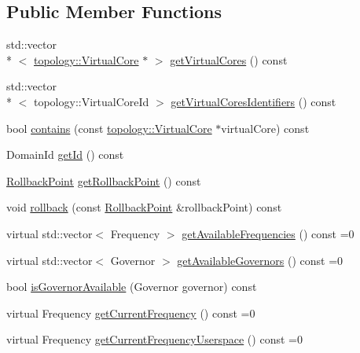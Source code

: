 \subsection*{Public Member Functions}
\begin{DoxyCompactItemize}
\item 
std\-::vector\\*
$<$ \hyperlink{classmammut_1_1topology_1_1VirtualCore}{topology\-::\-Virtual\-Core} $\ast$ $>$ \hyperlink{classmammut_1_1cpufreq_1_1Domain_aadbd6c6cd1d9c9abd6ac0100623b6f55}{get\-Virtual\-Cores} () const 
\item 
std\-::vector\\*
$<$ topology\-::\-Virtual\-Core\-Id $>$ \hyperlink{classmammut_1_1cpufreq_1_1Domain_a1952a345d43f937eb677170c488beeaf}{get\-Virtual\-Cores\-Identifiers} () const 
\item 
bool \hyperlink{classmammut_1_1cpufreq_1_1Domain_a48f7f709c4de763ae757cf792ef20f6c}{contains} (const \hyperlink{classmammut_1_1topology_1_1VirtualCore}{topology\-::\-Virtual\-Core} $\ast$virtual\-Core) const 
\item 
Domain\-Id \hyperlink{classmammut_1_1cpufreq_1_1Domain_a9e704e1fa89206f5238e8cc12eb1c3d0}{get\-Id} () const 
\item 
\hyperlink{structmammut_1_1cpufreq_1_1RollbackPoint}{Rollback\-Point} \hyperlink{classmammut_1_1cpufreq_1_1Domain_a7ce84c12b87b4aabb14686c38f64feae}{get\-Rollback\-Point} () const 
\item 
void \hyperlink{classmammut_1_1cpufreq_1_1Domain_abcd5b9b96fc708cd5456e8856a1b6f8a}{rollback} (const \hyperlink{structmammut_1_1cpufreq_1_1RollbackPoint}{Rollback\-Point} \&rollback\-Point) const 
\item 
virtual std\-::vector$<$ Frequency $>$ \hyperlink{classmammut_1_1cpufreq_1_1Domain_a77f57f47e688a3aaae168a2f9e8dc062}{get\-Available\-Frequencies} () const =0
\item 
virtual std\-::vector$<$ Governor $>$ \hyperlink{classmammut_1_1cpufreq_1_1Domain_ab72f441a05214166a07c4ece122f02c6}{get\-Available\-Governors} () const =0
\item 
bool \hyperlink{classmammut_1_1cpufreq_1_1Domain_a0e4d5b325d00884509f3c1f34d2525a3}{is\-Governor\-Available} (Governor governor) const 
\item 
virtual Frequency \hyperlink{classmammut_1_1cpufreq_1_1Domain_a915d7a5e4da2fe377c9805e86820ac3e}{get\-Current\-Frequency} () const =0
\item 
virtual Frequency \hyperlink{classmammut_1_1cpufreq_1_1Domain_abb5e1908d54a2af862e78b03a1a85af4}{get\-Current\-Frequency\-Userspace} () const =0

\end{DoxyCompactItemize}
